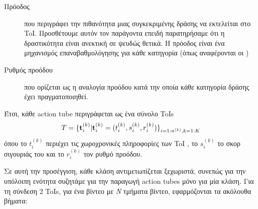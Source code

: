 \begin{description}
\item[ Πρόοδος  ] που περιγράφει την πιθανότητα μιας συγκεκριμένης δράσης να εκτελείται στο  \en ToI\gr.
 Προσθέτουμε αυτόν τον παράγοντα επειδή παρατηρήσαμε ότι η δραστικότητα είναι ανεκτική  σε ψευδώς θετικά. Η πρόοδος είναι
 ένα μηχανισμός επαναβαθμολόγησης για κάθε κατηγορία (όπως αναφέρονται οι  \cite{DBLP:journals/corr/abs-1903-00304})

\item [ Ρυθμός προόδου ] που ορίζεται ως η αναλογία προόδου κατά την οποία κάθε κατηγορία δράσης έχει πραγματοποιηθεί.
  
\end{description}

Έτσι, κάθε \en action tube \gr περιγράφεται ως ένα σύνολο \en ToIs \gr  
\[  T = {\{ {\bf t}_i^{(k)} | {\bf t}_i^{(k)} = ( t_i^{(k)}, s_i^{(k)}, r_i^{(k)} ) \}}_{i=1:n^{(k)},k=1:K} \]
όπου το $ t_i^{(k)} $ περιέχει τις χωροχρονικές πληροφορίες των \en ToI \gr, το   $ s_i^{(k)} $ το σκορ σιγουριάς του και
το $ r_i^{(k)} $ τον ρυθμό προόδου.

Σε αυτή την προσέγγιση, κάθε κλάση αντιμετωπίζεται ξεχωριστά, συνεπώς για την υπόλοιπη ενότητα
συζητάμε για την παραγωγή \en action tubes \gr μόνο για μία κλάση. Για τη σύνδεση 2 \en ToIs\gr, για
ένα βίντεο με \textit{N} τμήματα βίντεο, εφαρμόζονται τα ακόλουθα βήματα:

